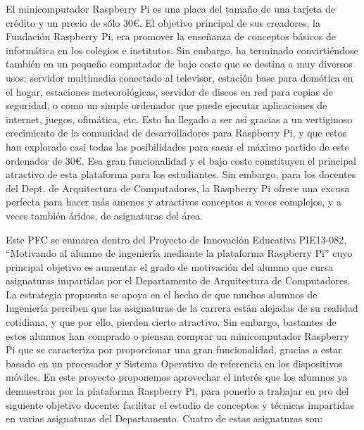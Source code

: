 \minitoc

\begin{sinopsis}
\label{sec:intro:sinop}
El minicomputador Raspberry Pi es una placa del tamaño de una tarjeta de crédito y un
precio de sólo 30€. El objetivo principal de sus creadores, la Fundación Raspberry Pi,
era promover la enseñanza de conceptos básicos de informática en los colegios e institutos.
Sin embargo, ha terminado convirtiéndose también en un pequeño computador de bajo
coste que se destina a muy diversos usos: servidor multimedia conectado al televisor,
estación base para domótica en el hogar, estaciones meteorológicas, servidor de discos
en red para copias de seguridad, o como un simple ordenador que puede ejecutar
aplicaciones de internet, juegos, ofimática, etc. Esto ha llegado a ser así gracias
a un vertiginoso crecimiento de la comunidad de desarrolladores para Raspberry Pi,
y que estos han explorado casi todas las posibilidades para sacar el máximo partido
de este ordenador de 30€. Esa gran funcionalidad y el bajo coste constituyen el
principal atractivo de esta plataforma para los estudiantes. Sin embargo, para los
docentes del Dept. de Arquitectura de Computadores, la Raspberry Pi ofrece una excusa
perfecta para hacer más amenos y atractivos conceptos a veces complejos, y a veces
también áridos, de asignaturas del área.

Este PFC se enmarca dentro del Proyecto de Innovación Educativa PIE13-082, ``Motivando
al alumno de ingeniería mediante la plataforma Raspberry Pi'' cuyo principal objetivo es
aumentar el grado de motivación del alumno que cursa asignaturas impartidas por el
Departamento de Arquitectura de Computadores. La estrategia propuesta se apoya en el
hecho de que muchos alumnos de Ingeniería perciben que las asignaturas de la carrera
están alejadas de su realidad cotidiana, y que por ello, pierden cierto atractivo. Sin
embargo, bastantes de estos alumnos han comprado o piensan comprar un minicomputador
Raspberry Pi que se caracteriza por proporcionar una gran funcionalidad, gracias a
estar basado en un procesador y Sistema Operativo de referencia en los dispositivos
móviles. En este proyecto proponemos aprovechar el interés que los alumnos ya
demuestran por la plataforma Raspberry Pi, para ponerlo a trabajar en pro del
siguiente objetivo docente: facilitar el estudio de conceptos y técnicas impartidas
en varias asignaturas del Departamento. Cuatro de estas asignaturas son:


\end{sinopsis}
